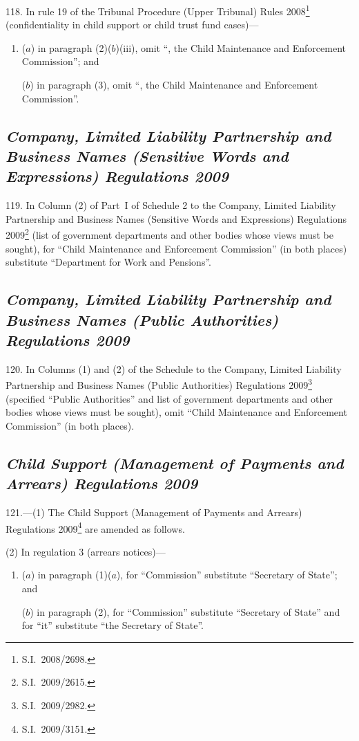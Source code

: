 \documentclass[12pt,a4paper]{article}
\begin{document}
118.  In rule 19 of the Tribunal Procedure (Upper Tribunal) Rules 2008\footnote{S.I.~2008/2698.} (confidentiality in child support or child trust fund cases)—
\begin{enumerate}\item[]
($a$) in paragraph (2)($b$)(iii), omit “, the Child Maintenance and Enforcement Commission”; and

($b$) in paragraph (3), omit “, the Child Maintenance and Enforcement Commission”.
\end{enumerate}

\subsection*{\itshape\sloppy
Company, Limited Liability Partnership and Business Names (Sensitive Words and Expressions) Regulations 2009}

119.  In Column (2) of Part~I of Schedule 2 to the Company, Limited Liability Partnership and Business Names (Sensitive Words and Expressions) Regulations 2009\footnote{S.I.~2009/2615.} (list of government departments and other bodies whose views must be sought), for “Child Maintenance and Enforcement Commission” (in both places) substitute “Department for Work and Pensions”.

\subsection*{\itshape
Company, Limited Liability Partnership and Business Names (Public Authorities) Regulations 2009
}

120.  In Columns (1) and (2) of the Schedule to the Company, Limited Liability Partnership and Business Names (Public Authorities) Regulations 2009\footnote{S.I.~2009/2982.} (specified “Public Authorities” and list of government departments and other bodies whose views must be sought), omit “Child Maintenance and Enforcement Commission” (in both places).

\subsection*{\itshape\sloppy
Child Support (Management of Payments and Arrears) Regulations 2009
}

121.---(1)  The Child Support (Management of Payments and Arrears) Regulations 2009\footnote{S.I.~2009/3151.} are amended as follows.

(2) In regulation 3 (arrears notices)—
\begin{enumerate}\item[]
($a$) in paragraph (1)($a$), for “Commission” substitute “Secretary of State”; and

($b$) in paragraph (2), for “Commission” substitute “Secretary of State” and for “it” substitute “the Secretary of State”.
\end{enumerate}
\end{document}
